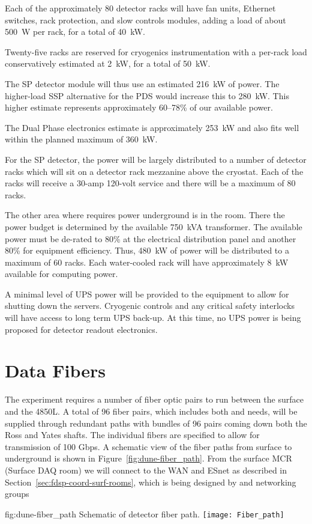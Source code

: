 Each of the approximately 80 detector racks will have fan units,
Ethernet switches, rack protection, and slow controls modules, adding
a load of about 500~W per rack, for a total of 40~kW.

Twenty-five racks are reserved for cryogenics instrumentation with a
per-rack load conservatively estimated at 2~kW, for a total of 50~kW.

The SP detector module will thus use an estimated 216~kW of power. The
higher-load SSP alternative for the PDS would increase this to
280~kW. This higher estimate represents approximately 60--78\% of
our available power.

The Dual Phase electronics estimate is
approximately 253~kW and also fits well within the planned maximum of
360~kW.

For the SP detector, the power will be largely distributed to a number
of detector racks which will sit on a detector rack mezzanine above
the cryostat.  Each of the racks will receive a 30-amp 120-volt
service and there will be a maximum of 80 racks.

The other area where  requires power underground is in the 
room.  There the power budget is determined by the available 750~kVA
transformer.  The available power must be de-rated to 80\% at
the electrical distribution panel and another 80\% for equipment
efficiency.  Thus, 480~kW of power will be distributed to a maximum of
60 racks.  Each water-cooled rack will have approximately 8~kW
available for computing power.

A minimal level of UPS power will be provided to the  equipment to
allow for shutting down the servers.  Cryogenic controls and any
critical safety interlocks will have access to long term UPS back-up.
At this time, no UPS power is being proposed for detector readout
electronics.


\section{Data Fibers}
\label{sec:fdsp-coord-faci-fibers}


The  experiment requires a number of fiber optic pairs to
run between the surface and the 4850L.  A total of 96 fiber
pairs, which includes both  and  needs, will
be supplied through redundant paths with bundles of 96 pairs coming
down both the Ross and Yates shafts.  The individual fibers are
specified to allow for transmission of 100 Gbps.  A schematic view of
the fiber paths from surface to underground is shown in
Figure~\ref{fig:dune-fiber_path}. From the surface MCR (Surface DAQ
room) we will connect to the WAN and ESnet as described in
Section~\ref{sec:fdsp-coord-surf-rooms}, which is being designed by
 and \fnal networking groups
\begin{dunefigure}{fig:dune-fiber_path}
  {Schematic of detector fiber path.}
  \texttt{[image: Fiber\_path]}
\end{dunefigure}

